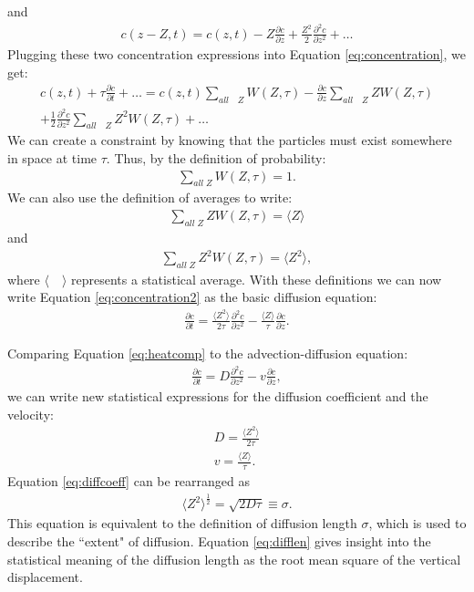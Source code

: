 \documentclass[draft, jgrga]{AGUTeX}
\begin{document}
\begin{article}
and
\begin{eqnarray}
c(z-Z,t) = c(z,t) - Z \frac{\partial c}{\partial z} + \frac{Z^2}{2} \frac{\partial^2 c}{\partial z^2} + \ldots
\end{eqnarray}
Plugging these two concentration expressions into Equation \ref{eq:concentration}, we get:
\begin{eqnarray}
  \label{eq:concentration2}
c(z,t)+ \tau \frac{\partial c}{\partial t} + \ldots  =
c(z,t) \sum_{all \quad Z} W(Z,\tau) - \frac{\partial c}{\partial z}
\sum_{all \quad Z} ZW(Z, \tau) \\
+ \frac{1}{2} \frac{\partial ^2 c}{\partial z^2}
\sum_{all \quad Z} Z^2 W(Z, \tau) + \ldots \nonumber
\end{eqnarray}
We can create a constraint by knowing that the particles must exist somewhere in space at time \begin{math} \tau \end{math}. Thus, by the definition of probability:
\begin{eqnarray}
\sum_{all \; Z} W(Z,\tau) = 1.
\end{eqnarray}
We can also use the definition of averages to write:
\begin{eqnarray}
\sum_{all \; Z} ZW (Z,\tau) = \langle Z \rangle
\end{eqnarray}
and
\begin{eqnarray}
\sum_{all \; Z} Z^2 W (Z,\tau) = \langle Z^2 \rangle,
\end{eqnarray}
where $\langle \quad \rangle$ represents a statistical average. With these definitions we can now write Equation \ref{eq:concentration2} as the basic diffusion equation:
\begin{eqnarray}
  \label{eq:heatcomp}
\frac {\partial c}{\partial t}
= \frac{\langle Z^2 \rangle}{2 \tau} \frac{\partial^2 c}{\partial z^2}
- \frac{\langle Z \rangle}{\tau} \frac{\partial c}{\partial z}.
\end{eqnarray}

Comparing Equation \ref{eq:heatcomp} to the advection-diffusion equation:
\begin{eqnarray*}
  \frac {\partial c}{\partial t}
  = D \frac{\partial^2 c}{\partial z^2}
  - v \frac{\partial c}{\partial z},
\end{eqnarray*}
we can write new statistical expressions for the diffusion coefficient and the velocity:
\begin{eqnarray}
D = \frac{\langle Z^2 \rangle}{2 \tau} \label{eq:diffcoeff}\\
v = \frac{\langle Z \rangle}{\tau}.
\end{eqnarray}
Equation \ref{eq:diffcoeff} can be rearranged as
\begin{eqnarray}
\langle Z^2 \rangle ^\frac{1}{2}
= \sqrt{2D\tau} \equiv \sigma. \label{eq:difflen}
\end{eqnarray}
This equation is equivalent to the definition of diffusion length $\sigma$, which is used to describe the ``extent" of diffusion. Equation \ref{eq:difflen} gives insight into the statistical meaning of the diffusion length as the root mean square of the vertical displacement.



\end{article}
\end{document}
